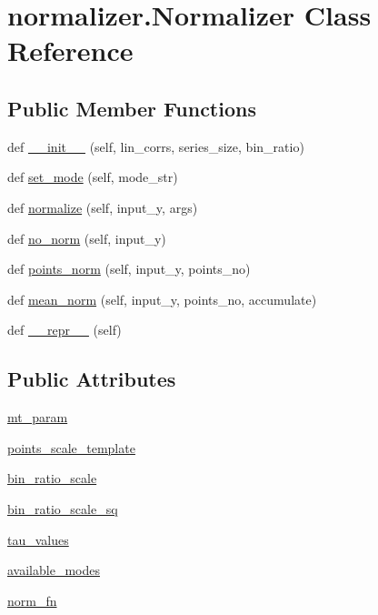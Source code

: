 \hypertarget{classnormalizer_1_1Normalizer}{}\section{normalizer.\+Normalizer Class Reference}
\label{classnormalizer_1_1Normalizer}
\subsection*{Public Member Functions}
\begin{DoxyCompactItemize}
\item 
def \hyperlink{classnormalizer_1_1Normalizer_afccec17549a3a8de54c39b7b5de3d4b7}{\+\_\+\+\_\+init\+\_\+\+\_\+} (self, lin\+\_\+corrs, series\+\_\+size, bin\+\_\+ratio)
\item 
def \hyperlink{classnormalizer_1_1Normalizer_ab4e48dd4987836c7254f148672dc32f0}{set\+\_\+mode} (self, mode\+\_\+str)
\item 
def \hyperlink{classnormalizer_1_1Normalizer_acae7ff724a12ef29c97f6eb2d30f5d62}{normalize} (self, input\+\_\+y, args)
\item 
def \hyperlink{classnormalizer_1_1Normalizer_a7965c29d7d3a867dbb82cc7f3e7e69b3}{no\+\_\+norm} (self, input\+\_\+y)
\item 
def \hyperlink{classnormalizer_1_1Normalizer_a44aea90aa5ab90fbc6cc617acdc589c5}{points\+\_\+norm} (self, input\+\_\+y, points\+\_\+no)
\item 
def \hyperlink{classnormalizer_1_1Normalizer_ac9530ba0efaa543756ecfef0e871b63e}{mean\+\_\+norm} (self, input\+\_\+y, points\+\_\+no, accumulate)
\item 
def \hyperlink{classnormalizer_1_1Normalizer_a09b6d62bec3fca383a1a9c82cc74836a}{\+\_\+\+\_\+repr\+\_\+\+\_\+} (self)
\end{DoxyCompactItemize}
\subsection*{Public Attributes}
\begin{DoxyCompactItemize}
\item 
\hyperlink{classnormalizer_1_1Normalizer_a63904e0449ec33d948edb1e00eda6bec}{mt\+\_\+param}
\item 
\hyperlink{classnormalizer_1_1Normalizer_adbbbab69e55b4a0593122aa61e7853bc}{points\+\_\+scale\+\_\+template}
\item 
\hyperlink{classnormalizer_1_1Normalizer_a0d063c22fb9e3ee66192bbeb570c2c3e}{bin\+\_\+ratio\+\_\+scale}
\item 
\hyperlink{classnormalizer_1_1Normalizer_a0db45b11e7934a2ce3cdbabc54467164}{bin\+\_\+ratio\+\_\+scale\+\_\+sq}
\item 
\hyperlink{classnormalizer_1_1Normalizer_ae6fdb25c519b72b0f95cc4b2ce150f45}{tau\+\_\+values}
\item 
\hyperlink{classnormalizer_1_1Normalizer_a0fe7ba5c6b5ba3df8578d7edf8bd3ade}{available\+\_\+modes}
\item 
\hyperlink{classnormalizer_1_1Normalizer_a36df68fe4c6f2dbe72f08a71ad1c5fe1}{norm\+\_\+fn}
\end{DoxyCompactItemize}


